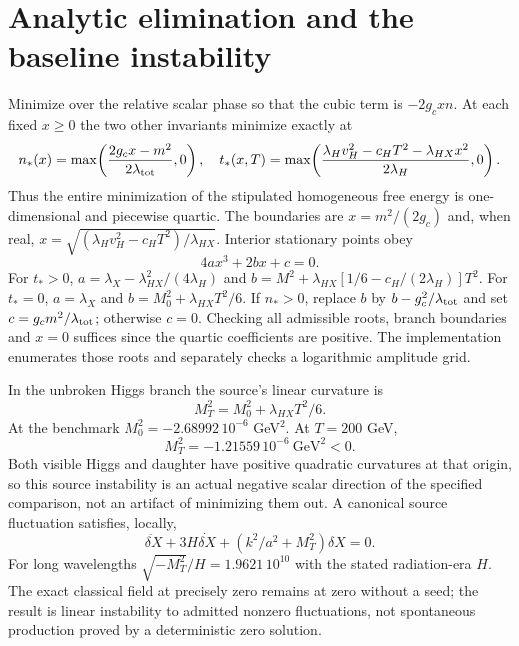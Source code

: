 \documentclass[11pt]{article}
\newcommand{\lp}{\lambda_{HX}}
\newcommand{\lt}{\lambda_{\rm tot}}
\begin{document}
\section{Analytic elimination and the baseline instability}
Minimize over the relative scalar phase so that the cubic term is
$-2g_cxn$. At each fixed $x\ge0$ the two other invariants minimize exactly at
\begin{equation}
 n_*(x)=\max\!\left(\frac{2g_cx-m^2}{2\lt},0\right),\quad
 t_*(x,T)=\max\!\left(\frac{\lambda_Hv_H^2-c_HT^2-\lp x^2}
 {2\lambda_H},0\right).
\label{eq:elim}
\end{equation}
Thus the entire minimization of the stipulated homogeneous free energy is
one-dimensional and piecewise quartic. The boundaries are
$x=m^2/(2g_c)$ and, when real,
$x=\sqrt{(\lambda_Hv_H^2-c_HT^2)/\lp}$.
Interior stationary points obey
\begin{equation}
 4a x^3+2b x+c=0.
\end{equation}
For $t_*>0$,
$a=\lambda_X-\lp^2/(4\lambda_H)$ and
$b=M^2+\lp[1/6-c_H/(2\lambda_H)]T^2$.
For $t_*=0$, $a=\lambda_X$ and $b=M_0^2+\lp T^2/6$.
If $n_*>0$, replace $b$ by $b-g_c^2/\lt$ and set
$c=g_cm^2/\lt$; otherwise $c=0$.
Checking all admissible roots, branch boundaries and $x=0$ suffices since
the quartic coefficients are positive. The implementation enumerates those
roots and separately checks a logarithmic amplitude grid.

In the unbroken Higgs branch the source's linear curvature is
\begin{equation}
 M_T^2=M_0^2+\lp T^2/6.
\end{equation}
At the benchmark $M_0^2=-2.68992\,10^{-6}$ GeV$^2$. At $T=200$ GeV,
\begin{equation}
 M_T^2=-1.21559\,10^{-6}\ \mathrm{GeV}^2<0.
\end{equation}
Both visible Higgs and daughter have positive quadratic curvatures at that
origin, so this source instability is an actual negative scalar direction
of the specified comparison, not an artifact of minimizing them out.
A canonical source fluctuation satisfies, locally,
\begin{equation}
 \ddot{\delta X}+3H\dot{\delta X}
 +(k^2/a^2+M_T^2)\delta X=0.
\end{equation}
For long wavelengths $\sqrt{-M_T^2}/H=1.9621\,10^{10}$ with the stated
radiation-era $H$. The exact classical field at precisely zero remains at
zero without a seed; the result is linear instability to admitted nonzero
fluctuations, not spontaneous production proved by a deterministic zero solution.
\end{document}
